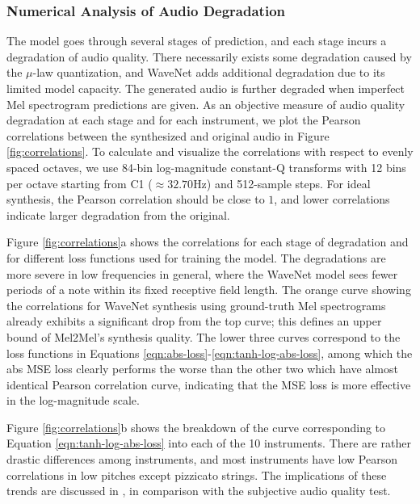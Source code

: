 \subsubsection{Numerical Analysis of Audio Degradation}

The model goes through several stages of prediction, and each stage incurs a degradation of audio quality.
There necessarily exists some degradation caused by the $\mu$-law quantization, and WaveNet adds additional degradation due to its limited model capacity.
The generated audio is further degraded when imperfect Mel spectrogram predictions are given.
As an objective measure of audio quality degradation at each stage and for each instrument, we plot the Pearson correlations between the synthesized and original audio in Figure \ref{fig:correlations}.
To calculate and visualize the correlations with respect to evenly spaced octaves, we use 84-bin log-magnitude constant-Q transforms with 12 bins per octave starting from C1 ($\approx 32.70 \textrm{Hz}$) and 512-sample steps.
For ideal synthesis, the Pearson correlation should be close to $1$, and lower correlations indicate larger degradation from the original.

Figure \ref{fig:correlations}a shows the correlations for each stage of degradation and for different loss functions used for training the model.
The degradations are more severe in low frequencies in general, where the WaveNet model sees fewer periods of a note within its fixed receptive field length.
The orange curve showing the correlations for WaveNet synthesis using ground-truth Mel spectrograms already exhibits a significant drop from the top curve; this defines an upper bound of Mel2Mel's synthesis quality.
The lower three curves correspond to the loss functions in Equations \ref{eqn:abs-loss}-\ref{eqn:tanh-log-abs-loss}, among which the abs MSE loss clearly performs the worse than the other two which have almost identical Pearson correlation curve, indicating that the MSE loss is more effective in the log-magnitude scale.

Figure \ref{fig:correlations}b shows the breakdown of the curve corresponding to Equation \ref{eqn:tanh-log-abs-loss} into each of the 10 instruments.
There are rather drastic differences among instruments, and most instruments have low Pearson correlations in low pitches except pizzicato strings.
The implications of these trends are discussed in \cite{kim2019synthesis}, in comparison with the subjective audio quality test.

